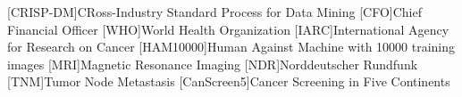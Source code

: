 \begin{acronym}[crisp-dm]
[CRISP-DM]{CRoss-Industry Standard Process for Data Mining}
[CFO]{Chief Financial Officer}
[WHO]{World Health Organization}
[IARC]{International Agency for Research on Cancer}
[HAM10000]{Human Against Machine with 10000 training images}
[MRI]{Magnetic Resonance Imaging}
[NDR]{Norddeutscher Rundfunk}
[TNM]{Tumor Node Metastasis}
[CanScreen5]{Cancer Screening in Five Continents}
\end{acronym}